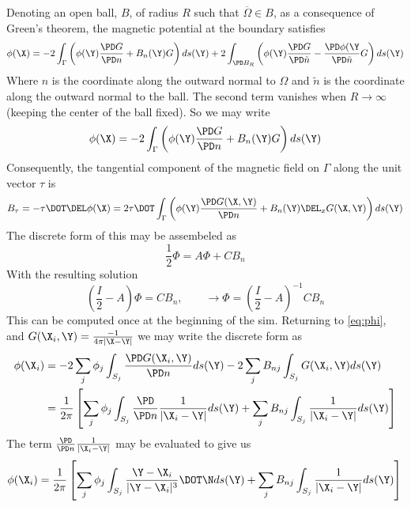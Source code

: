 \documentclass[11pt]{article}
\newcommand{\PSCHAIN}{..}
\newcommand{\rootdir}{\PSCHAIN}
\begin{document}
Denoting an open ball, $B$, of radius $R$ such that $\overline{\Omega}\in B$, as a consequence of Green's theorem, the magnetic potential at the boundary satisfies
\begin{equation}
  \phi(\X) =
  -2 \int_{\Gamma} \left( \phi(\Y)
  \frac{\PD G}{\PD n} + B_n(\Y) G \right) ds(\Y)
  +2 \int_{\PD B_R} \left( \phi(\Y)
  \frac{\PD G}{\PD \tilde{n}} - \frac{\PD \phi(\Y}{\PD \tilde{n}} G \right) ds(\Y)
\end{equation}
Where $n$ is the coordinate along the outward normal to $\Omega$ and $\tilde{n}$ is the coordinate along the outward normal to the ball. The second term vanishes when $R\rightarrow \infty$ (keeping the center of the ball fixed). So we may write
\begin{equation} \label{eq:phi}
  \phi(\X) =
  -2 \int_{\Gamma} \left( \phi(\Y)
  \frac{\PD G}{\PD n} + B_n(\Y) G \right) ds(\Y)
\end{equation}
Consequently, the tangential component of the magnetic field on $\Gamma$ along the unit vector $\tau$ is
\begin{equation}
  B_{\tau} = - \mathbf{\tau} \DOT \DEL \phi(\X) =
  2 \mathbf{\tau} \DOT
  \int_{\Gamma}
  \left(
  \phi(\Y) \frac{\PD G(\X,\Y)}{\PD n}
  + B_n(\Y) \DEL_x G(\X,\Y)
  \right) ds(\Y)
\end{equation}
The discrete form of this may be assembeled as
\begin{equation}
  \frac{1}{2} \Phi = A \Phi + C B_n
\end{equation}
With the resulting solution
\begin{equation}
  \left(\frac{I}{2} - A\right)\Phi = C B_n, \qquad
  \rightarrow
  \Phi = \left(\frac{I}{2} - A\right)^{-1} C B_n
\end{equation}
This can be computed once at the beginning of the sim. Returning to \ref{eq:phi}, and $G(\X_i,\Y) = \frac{-1}{4\pi |\X - \Y|}$ we may write the discrete form as
\begin{equation}
\begin{split}
\phi(\X_i) & = -2 \sum_j \phi_j \int_{S_j} \frac{\PD G(\X_i,\Y)}{\PD n} ds(\Y)
           -2 \sum_j B_{nj} \int_{S_j} G(\X_i,\Y) ds(\Y) \\
       & = \frac{1}{2 \pi}
       \left[
       \sum_j \phi_j \int_{S_j} \frac{\PD}{\PD n} \frac{1}{|\X_i-\Y|} ds(\Y)
     + \sum_j B_{nj} \int_{S_j} \frac{1}{|\X_i-\Y|} ds(\Y)
       \right] \\
\end{split}
\end{equation}
The term $\frac{\PD}{\PD n} \frac{1}{|\X_i-\Y|} $ may be evaluated to give us
\begin{equation}
\phi(\X_i) = \frac{1}{2 \pi}
       \left[
       \sum_j \phi_j \int_{S_j} \frac{\Y - \X_i}{| \Y - \X_i|^3} \DOT \N ds(\Y)
     + \sum_j B_{nj} \int_{S_j} \frac{1}{|\X_i-\Y|} ds(\Y)
       \right] \\
\end{equation}


\end{document}
